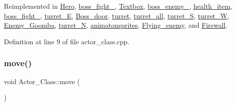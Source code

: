 Reimplemented in \hyperlink{class_hero_a1bee38d9164cf1ecda512cc24e81b171}{Hero}, \hyperlink{classboss__fight__3_ab642323b24a5f139339fffba4749ebdc}{boss\+\_\+fight\+\_}, \hyperlink{class_textbox_a995336eb1a269216afb4dcd187e39d0b}{Textbox}, \hyperlink{classboss__enemy__2_a7edccc066047aacf21797b6d4316f57c}{boss\+\_\+enemy\+\_}, \hyperlink{classhealth__item_af7e8d841f469ac5e225429aaddb06844}{health\+\_\+item}, \hyperlink{classboss__fight__1_a363121fd16c5d41889f96405544bccc1}{boss\+\_\+fight\+\_}, \hyperlink{classturret___e_a74827456c32525695ee09d5577c55fd4}{turret\+\_\+E}, \hyperlink{class_boss__door_ac2f0b88b5ca332380602f029f0f83e17}{Boss\+\_\+door}, \hyperlink{classturret_a6c97760cdfa379ce956c3f5d773c9f4e}{turret}, \hyperlink{classturret__all_ac746cd08cbf83804b585d0df70aa9472}{turret\+\_\+all}, \hyperlink{classturret___s_ab4ac035f439af50905a72227b19072a9}{turret\+\_\+S}, \hyperlink{classturret___w_af467ddd08bd7304716f5a336321b2ca5}{turret\+\_\+W}, \hyperlink{class_enemy___goomba_ab07621304a0b92c4559679071c060439}{Enemy\+\_\+\+Goomba}, \hyperlink{classturret___n_aec518dd6dacf05d1af45e6713a15ea5d}{turret\+\_\+N}, \hyperlink{classanimatonsprites_a45b6be4805c6e25497956b88c176f552}{animatonsprites}, \hyperlink{class_flying__enemy_af9f8bc6cf140ee0c4ce1f7e340ef79e5}{Flying\+\_\+enemy}, and \hyperlink{class_firewall_a6fd8ce6bf5731d822c0d47ee209dbe8d}{Firewall}.



Definition at line 9 of file actor\+\_\+class.\+cpp.

\hypertarget{class_actor___class_af1764a94c5410ba8476f56553cd2c327}{}\label{class_actor___class_af1764a94c5410ba8476f56553cd2c327} 
\subsubsection{\texorpdfstring{move()}{move()}}
{\footnotesize\ttfamily void Actor\+\_\+\+Class\+::move (\begin{DoxyParamCaption}{ }\end{DoxyParamCaption})\hspace{0.3cm}{\ttfamily [virtual]}}



